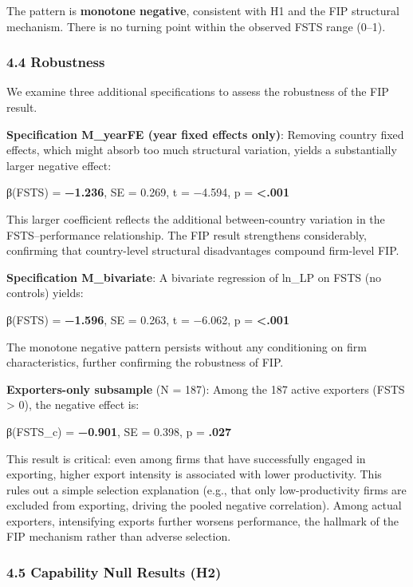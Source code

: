 \documentclass[12pt,a4paper]{article}
\begin{document}
The pattern is \textbf{monotone negative}, consistent with H1 and the
FIP structural mechanism. There is no turning point within the observed
FSTS range (0--1).

\hypertarget{44-robustness}{%
\subsubsection{4.4 Robustness}\label{44-robustness}}

We examine three additional specifications to assess the robustness of
the FIP result.

\textbf{Specification M\_yearFE (year fixed effects only)}: Removing
country fixed effects, which might absorb too much structural variation,
yields a substantially larger negative effect:

β(FSTS) = \textbf{−1.236}, SE = 0.269, t = −4.594, p =
\textbf{\textless.001}

This larger coefficient reflects the additional between-country
variation in the FSTS--performance relationship. The FIP result
strengthens considerably, confirming that country-level structural
disadvantages compound firm-level FIP.

\textbf{Specification M\_bivariate}: A bivariate regression of ln\_LP on
FSTS (no controls) yields:

β(FSTS) = \textbf{−1.596}, SE = 0.263, t = −6.062, p =
\textbf{\textless.001}

The monotone negative pattern persists without any conditioning on firm
characteristics, further confirming the robustness of FIP.

\textbf{Exporters-only subsample} (N = 187): Among the 187 active
exporters (FSTS \textgreater{} 0), the negative effect is:

β(FSTS\_c) = \textbf{−0.901}, SE = 0.398, p = \textbf{.027}

This result is critical: even among firms that have successfully engaged
in exporting, higher export intensity is associated with lower
productivity. This rules out a simple selection explanation (e.g., that
only low-productivity firms are excluded from exporting, driving the
pooled negative correlation). Among actual exporters, intensifying
exports further worsens performance, the hallmark of the FIP mechanism
rather than adverse selection.

\hypertarget{45-capability-null-results-h2}{%
\subsubsection{4.5 Capability Null Results
(H2)}\label{45-capability-null-results-h2}}
\end{document}
